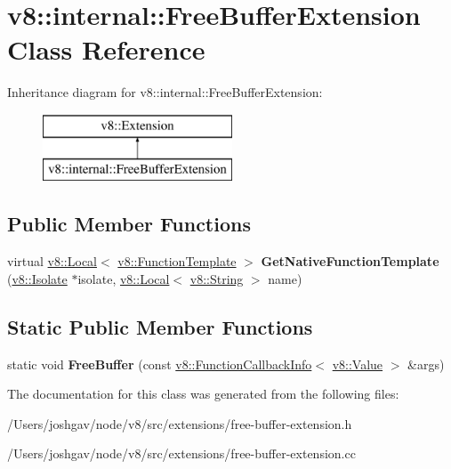 \hypertarget{classv8_1_1internal_1_1_free_buffer_extension}{}\section{v8\+:\+:internal\+:\+:Free\+Buffer\+Extension Class Reference}
\label{classv8_1_1internal_1_1_free_buffer_extension}
Inheritance diagram for v8\+:\+:internal\+:\+:Free\+Buffer\+Extension\+:\begin{figure}[H]
\begin{center}
\leavevmode
\includegraphics[height=2.000000cm]{classv8_1_1internal_1_1_free_buffer_extension}
\end{center}
\end{figure}
\subsection*{Public Member Functions}
\begin{DoxyCompactItemize}
\item 
virtual \hyperlink{classv8_1_1_local}{v8\+::\+Local}$<$ \hyperlink{classv8_1_1_function_template}{v8\+::\+Function\+Template} $>$ {\bfseries Get\+Native\+Function\+Template} (\hyperlink{classv8_1_1_isolate}{v8\+::\+Isolate} $\ast$isolate, \hyperlink{classv8_1_1_local}{v8\+::\+Local}$<$ \hyperlink{classv8_1_1_string}{v8\+::\+String} $>$ name)\hypertarget{classv8_1_1internal_1_1_free_buffer_extension_a063dadb180c2b12881215a2779571318}{}\label{classv8_1_1internal_1_1_free_buffer_extension_a063dadb180c2b12881215a2779571318}

\end{DoxyCompactItemize}
\subsection*{Static Public Member Functions}
\begin{DoxyCompactItemize}
\item 
static void {\bfseries Free\+Buffer} (const \hyperlink{classv8_1_1_function_callback_info}{v8\+::\+Function\+Callback\+Info}$<$ \hyperlink{classv8_1_1_value}{v8\+::\+Value} $>$ \&args)\hypertarget{classv8_1_1internal_1_1_free_buffer_extension_a60bbe3eb396479ad28ad03d14ee93535}{}\label{classv8_1_1internal_1_1_free_buffer_extension_a60bbe3eb396479ad28ad03d14ee93535}

\end{DoxyCompactItemize}


The documentation for this class was generated from the following files\+:\begin{DoxyCompactItemize}
\item 
/\+Users/joshgav/node/v8/src/extensions/free-\/buffer-\/extension.\+h\item 
/\+Users/joshgav/node/v8/src/extensions/free-\/buffer-\/extension.\+cc\end{DoxyCompactItemize}
